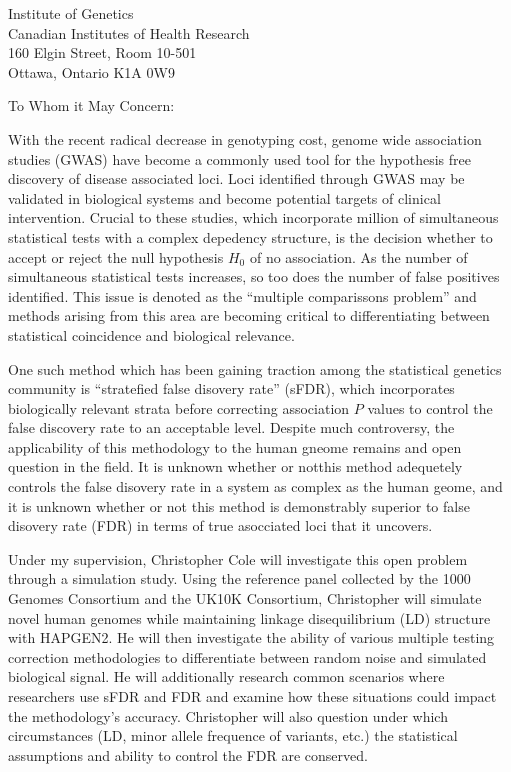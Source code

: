 \documentclass{letter}
\begin{document}
\begin{letter}{Institute of Genetics \\ Canadian Institutes of Health Research \\ 160 Elgin Street, Room 10-501 \\ Ottawa, Ontario K1A 0W9}
\opening{To Whom it May Concern:}
\thispagestyle{fancy}
\setlength{\parindent}{0.5cm}


With the recent radical decrease in genotyping cost, genome wide association studies (GWAS) have become a commonly used tool for the hypothesis free discovery of disease associated loci. Loci identified through GWAS may be validated in biological systems and become potential targets of clinical intervention. Crucial to these studies, which incorporate million of simultaneous statistical tests with a complex depedency structure, is the decision whether to accept or reject the null hypothesis $H_0$ of no association. As the number of simultaneous statistical tests increases, so too does the number of false positives identified. This issue is denoted as the ``multiple comparissons problem'' and methods arising from this area are becoming critical to differentiating between statistical coincidence and biological relevance. 

One such method which has been gaining traction among the statistical genetics community is ``stratefied false disovery rate'' (sFDR), which incorporates biologically relevant strata before correcting association $P$ values to control the false discovery rate to an acceptable level. Despite much controversy, the applicability of this methodology to the human gneome remains and open question in the field. It is unknown whether or notthis method adequetely controls the false disovery rate in a system as complex as the human geome, and it is unknown whether or not this method is demonstrably superior to false disovery rate (FDR) in terms of true asocciated loci that it uncovers. 

Under my supervision, Christopher Cole will investigate this open problem through a simulation study. Using the reference panel collected by the 1000 Genomes Consortium and the UK10K Consortium, Christopher will simulate novel human genomes while maintaining linkage disequilibrium (LD) structure with HAPGEN2. He will then investigate the ability of various multiple testing correction methodologies to differentiate between random noise and simulated biological signal. He will additionally research common scenarios where researchers use sFDR and FDR and examine how these situations could impact the methodology's accuracy. Christopher will also question under which circumstances (LD, minor allele frequence of variants, etc.) the statistical assumptions and ability to control the FDR are conserved.  


\end{letter}
\end{document}
